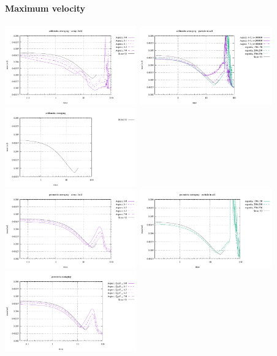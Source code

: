 \paragraph{Maximum velocity}
\begin{center}
\includegraphics[width=5.7cm]{images/stokes_sphere_fs2D/max_vel_arithm_comp}
\includegraphics[width=5.7cm]{images/stokes_sphere_fs2D/max_vel_arithm_pic}
\includegraphics[width=5.7cm]{images/stokes_sphere_fs2D/max_vel_arithm_add}\\
\includegraphics[width=5.7cm]{images/stokes_sphere_fs2D/max_vel_geom_comp}
\includegraphics[width=5.7cm]{images/stokes_sphere_fs2D/max_vel_geom_pic}
\includegraphics[width=5.7cm]{images/stokes_sphere_fs2D/max_vel_geom_add}\\

\end{center}
